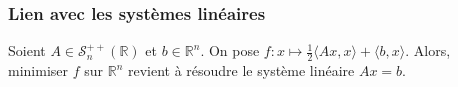   \subsubsection{Lien avec les systèmes linéaires}


  \begin{proposition}
    Soient $A \in \mathcal{S}_n^{++}(\mathbb{R})$ et $b \in \mathbb{R}^n$. On pose $f : x \mapsto \frac{1}{2} \langle Ax, x \rangle + \langle b, x \rangle$. Alors, minimiser $f$ sur $\mathbb{R}^n$ revient à résoudre le système linéaire $Ax=b$.
  \end{proposition}

